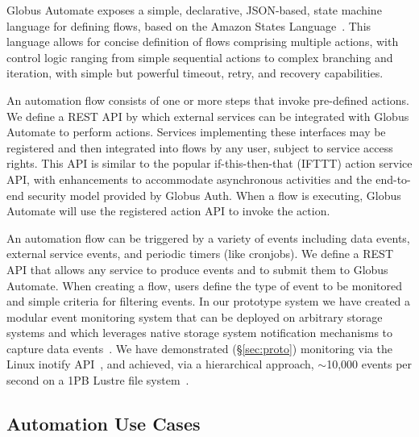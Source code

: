 \documentclass{aip-cp}
\newcommand\kyle[1]{}
\newcommand\kyle[1]{{\color{purple}[Kyle: #1]}}
\begin{document}
Globus Automate exposes a simple, declarative, JSON-based, state machine 
language for defining flows, 
based on the Amazon States Language~\cite{AmazonStates}. 
This language allows for concise definition of flows comprising multiple actions, with control logic ranging from simple sequential actions to complex branching and iteration, with simple but powerful timeout, retry, and recovery capabilities. 

An automation flow consists of one or more steps that invoke pre-defined actions. 
We define a REST API by which external services can be integrated with Globus Automate to perform actions. 
Services implementing these interfaces may
be registered and then integrated into flows by any user, subject to service access rights. 
This API is similar to the popular if-this-then-that (IFTTT) action service API, 
with enhancements to accommodate asynchronous activities and the end-to-end security model provided by Globus Auth. When a flow is executing, Globus Automate will use
the registered action API to invoke the action.

An automation flow can be triggered by a variety of events including 
data events, external service events, and periodic timers (like cronjobs).
We define a REST API that allows any service to produce events
and to submit them to Globus Automate. When creating a flow, 
users define the type of event to be monitored and simple criteria
for filtering events. 
In our prototype system we have created a modular event monitoring system that
can be deployed on arbitrary storage systems and which leverages
native storage system notification mechanisms to capture data events~\cite{chard17ripple}. 
We have demonstrated (\S\ref{sec:proto}) monitoring via the Linux
inotify API~\cite{inotify}, and achieved, via a hierarchical approach, 
$\sim$10,000 events per second on a 1PB Lustre file system~\cite{paul17scalable}.  

\kyle{Do we want to include the automate picture from the proposal? 
Its a little aspirational at this stage. But its a nice picture.}

\subsection{Automation Use Cases}
\kyle{The following text is stolen from CSSI - do we want such an example?
If so, perhaps Ryan can make this accurate.. and add a nice picture.}
\end{document}
